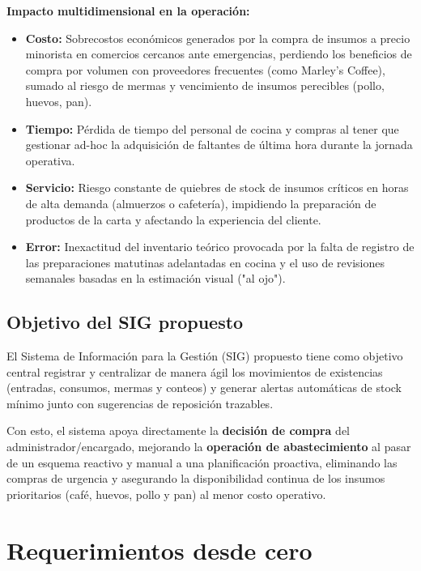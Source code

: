 \documentclass[11pt,letterpaper]{article}
\begin{document}
\vspace{0.3cm}
\textbf{Impacto multidimensional en la operación:}
\begin{itemize}
    \item \textbf{Costo:} Sobrecostos económicos generados por la compra de insumos a precio minorista en comercios cercanos ante emergencias, perdiendo los beneficios de compra por volumen con proveedores frecuentes (como Marley's Coffee), sumado al riesgo de mermas y vencimiento de insumos perecibles (pollo, huevos, pan).
    \item \textbf{Tiempo:} Pérdida de tiempo del personal de cocina y compras al tener que gestionar ad-hoc la adquisición de faltantes de última hora durante la jornada operativa.
    \item \textbf{Servicio:} Riesgo constante de quiebres de stock de insumos críticos en horas de alta demanda (almuerzos o cafetería), impidiendo la preparación de productos de la carta y afectando la experiencia del cliente.
    \item \textbf{Error:} Inexactitud del inventario teórico provocada por la falta de registro de las preparaciones matutinas adelantadas en cocina y el uso de revisiones semanales basadas en la estimación visual ("al ojo").
\end{itemize}

\subsection{Objetivo del SIG propuesto}
El Sistema de Información para la Gestión (SIG) propuesto tiene como objetivo central registrar y centralizar de manera ágil los movimientos de existencias (entradas, consumos, mermas y conteos) y generar alertas automáticas de stock mínimo junto con sugerencias de reposición trazables. 

Con esto, el sistema apoya directamente la \textbf{decisión de compra} del administrador/encargado, mejorando la \textbf{operación de abastecimiento} al pasar de un esquema reactivo y manual a una planificación proactiva, eliminando las compras de urgencia y asegurando la disponibilidad continua de los insumos prioritarios (café, huevos, pollo y pan) al menor costo operativo.

\newpage

\section{Requerimientos desde cero}
\end{document}
